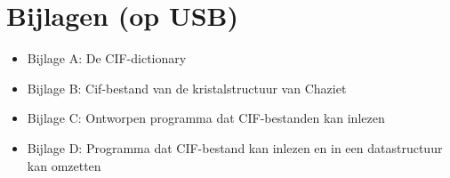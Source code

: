 \chapter*{Bijlagen (op USB)}

\begin{itemize}  

\item Bijlage A: \qquad	De CIF-dictionary 

\item Bijlage B: \qquad	Cif-bestand van de kristalstructuur van Chaziet  

\item Bijlage C: \qquad	Ontworpen programma dat CIF-bestanden kan inlezen

\item Bijlage D: \qquad	Programma dat CIF-bestand kan inlezen en in een datastructuur kan omzetten 
\end{itemize}


